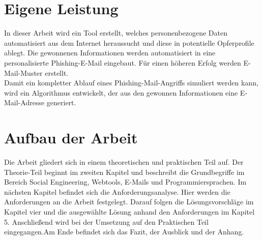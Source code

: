  	
\section{Eigene Leistung}
\label {sec:Eigene Leistung} 
In dieser Arbeit wird ein Tool erstellt, welches personenbezogene Daten automatisiert aus dem Internet heraussucht und diese in potentielle Opferprofile ablegt. Die gewonnenen Informationen werden  automatisiert in eine personalisierte Phishing-E-Mail eingebaut. Für einen höheren Erfolg werden E-Mail-Muster erstellt.\\
Damit ein kompletter Ablauf eines Phishing-Mail-Angriffs simuliert werden kann, wird ein Algorithmus entwickelt, der aus den gewonnen Informationen eine E-Mail-Adresse generiert.

\section{Aufbau der Arbeit}
\label {sec:Aufbau der Arbeit} 
Die Arbeit gliedert sich in einem theoretischen und praktischen Teil auf. Der Theorie-Teil beginnt im zweiten Kapitel und beschreibt die Grundbegriffe im Bereich Social Engineering, Webtools, E-Mails und Programmiersprachen. Im nächsten Kapitel befindet sich die Anforderungsanalyse. Hier werden die Anforderungen an die Arbeit festgelegt. Darauf folgen die Lösungsvorschläge im Kapitel vier und die ausgewählte Lösung anhand den Anforderungen im Kapitel 5. Anschließend wird bei der Umsetzung auf den Praktischen Teil eingegangen.Am Ende befindet sich das Fazit, der Ausblick und der Anhang.






